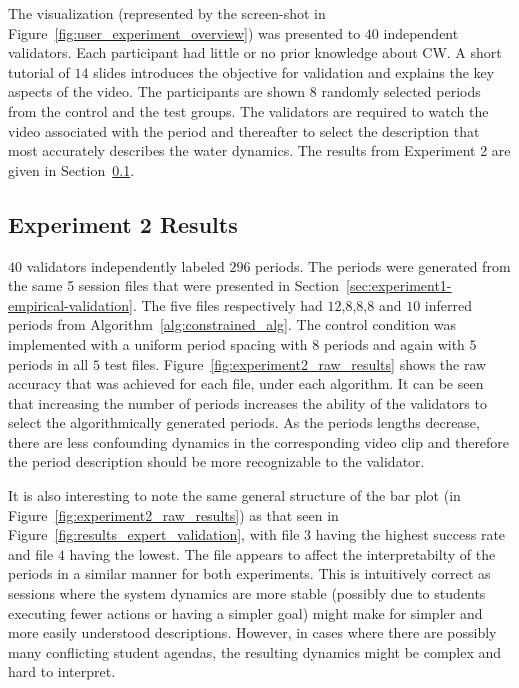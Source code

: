 The visualization (represented by the screen-shot in Figure~\ref{fig:user_experiment_overview}) was presented to $40$ independent validators. Each participant had little or no prior knowledge about CW. A short tutorial of $14$ slides introduces the objective for validation and explains the key aspects of the video. The participants are shown $8$ randomly selected periods from the control and the test groups. The validators are required to watch the video associated with the period and thereafter to select the description that most accurately describes the water dynamics. The results from Experiment 2 are given in Section~\ref{sec:experiment2-empirical-validation-results}.

\subsection{Experiment 2 Results}\label{sec:experiment2-empirical-validation-results}

$40$ validators independently labeled $296$ periods. The periods were generated from the same 5 session files that were presented in Section~\ref{sec:experiment1-empirical-validation}. The five files respectively had $12$,$8$,$8$,$8$ and $10$ inferred periods from Algorithm~\ref{alg:constrained_alg}. The control condition was implemented with a uniform period spacing with $8$ periods and again with $5$ periods in all $5$ test files. Figure~\ref{fig:experiment2_raw_results} shows the raw accuracy that was achieved for each file, under each algorithm. It can be seen that increasing the number of periods increases the ability of the validators to select the algorithmically generated periods. As the periods lengths decrease, there are less confounding dynamics in the corresponding video clip and therefore the period description should be more recognizable to the validator.

It is also interesting to note the same general structure of the bar plot (in Figure~\ref{fig:experiment2_raw_results}) as that seen in Figure~\ref{fig:results_expert_validation}, with file $3$ having the highest success rate and file $4$ having the lowest. The file appears to affect the interpretabilty of the periods in a similar manner for both experiments. This is intuitively correct as sessions where the system dynamics are more stable (possibly due to students executing fewer actions or having a simpler goal) might make for simpler and more easily understood descriptions. However, in cases where there are possibly many conflicting student agendas, the resulting dynamics might be complex and hard to interpret.

